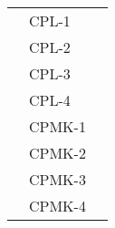 \documentclass[12pt, landscape]{simrep} %
\begin{document}
\begin{longtable}{*{8}{P{1.15in}}@{}}
                                          & CPL-1                                                        &                                                                                                         \\


                                           & CPL-2                                                        &                                                                                                         \\

	                                           & CPL-3                                                        &                                                                                                         \\

	                                           & CPL-4                                                        &                                                                                                         \\
                                          \midrule

	                                           & CPMK-1                                                       &                                                                                                        \\


	                                           & CPMK-2                                                       &                                                                                                        \\

	                                           & CPMK-3                                                       &                                                                                                        \\

	                                           & CPMK-4                                                       &                                                                                                        \\


\end{longtable}
\end{document}
